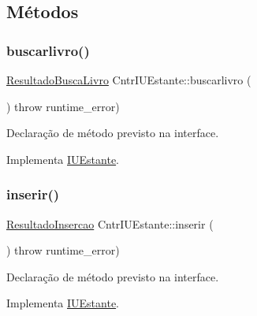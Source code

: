 \subsection{Métodos}
\mbox{\label{class_cntr_i_u_estante_a0ada4c7c0131f888081aa446bbd92f64}} 
\subsubsection{\texorpdfstring{buscarlivro()}{buscarlivro()}}
{\footnotesize\ttfamily \hyperlink{class_resultado_busca_livro}{Resultado\+Busca\+Livro} Cntr\+I\+U\+Estante\+::buscarlivro (\begin{DoxyParamCaption}{ }\end{DoxyParamCaption}) throw  runtime\+\_\+error) \hspace{0.3cm}{\ttfamily [virtual]}}

Declaração de método previsto na interface. 

Implementa \hyperlink{class_i_u_estante_a0999af8632d4dae7524396d5b3f8788b}{I\+U\+Estante}.

\mbox{\label{class_cntr_i_u_estante_abe47425cb3d9951b31401b1540dc95a4}} 
\subsubsection{\texorpdfstring{inserir()}{inserir()}}
{\footnotesize\ttfamily \hyperlink{class_resultado_insercao}{Resultado\+Insercao} Cntr\+I\+U\+Estante\+::inserir (\begin{DoxyParamCaption}{ }\end{DoxyParamCaption}) throw  runtime\+\_\+error) \hspace{0.3cm}{\ttfamily [virtual]}}

Declaração de método previsto na interface. 

Implementa \hyperlink{class_i_u_estante_acac88664a3d979dbfb4fd5c8ce882aac}{I\+U\+Estante}.

\mbox{\label{class_cntr_i_u_estante_ade15f7b3b360e31d1df95c4fe7bd65e9}} 
